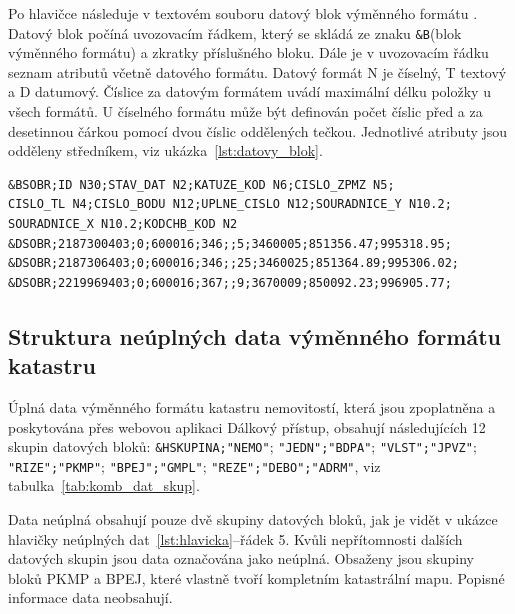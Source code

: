 Po hlavičce následuje v textovém souboru  datový blok výměnného formátu . Datový blok počíná uvozovacím řádkem, který se skládá ze znaku \verb|&B|(blok výměnného formátu) a zkratky příslušného bloku. Dále je v uvozovacím řádku seznam atributů včetně datového formátu. Datový formát N je číselný, T textový a D datumový. Číslice za datovým formátem uvádí maximální délku položky u všech formátů. U číselného formátu může být definován počet číslic před a za desetinnou čárkou pomocí dvou číslic oddělených tečkou. Jednotlivé atributy jsou odděleny středníkem, viz ukázka~\ref{lst:datovy_blok}.

{\small
\begin{lstlisting}[caption=Ukázka datového bloku SOBR(souřadnice obrazu bodů polohopisu v mapě) neúplných dat, label=lst:datovy_blok]
&BSOBR;ID N30;STAV_DAT N2;KATUZE_KOD N6;CISLO_ZPMZ N5;
CISLO_TL N4;CISLO_BODU N12;UPLNE_CISLO N12;SOURADNICE_Y N10.2;
SOURADNICE_X N10.2;KODCHB_KOD N2
&DSOBR;2187300403;0;600016;346;;5;3460005;851356.47;995318.95;
&DSOBR;2187306403;0;600016;346;;25;3460025;851364.89;995306.02;
&DSOBR;2219969403;0;600016;367;;9;3670009;850092.23;996905.77;
\end{lstlisting}}

\subsection{Struktura neúplných data výměnného formátu katastru}
\label{subsec:neuplna_data}
Úplná data výměnného formátu katastru nemovitostí, která jsou zpoplatněna a poskytována přes webovou aplikaci Dálkový přístup, obsahují následujících 12 skupin datových bloků: \verb|&HSKUPINA;"NEMO"|; \verb|"JEDN";"BDPA"|; \verb|"VLST";"JPVZ"|; \verb|"RIZE";"PKMP"|; \verb|"BPEJ";"GMPL"|; \verb|"REZE";"DEBO";"ADRM"|, viz tabulka~\ref{tab:komb_dat_skup}.

Data neúplná obsahují pouze dvě skupiny datových bloků, jak je vidět v ukázce hlavičky neúplných dat~\ref{lst:hlavicka}--řádek 5. Kvůli nepřítomnosti dalších datových skupin jsou data označována jako neúplná. Obsaženy jsou skupiny bloků PKMP a BPEJ, které vlastně tvoří kompletním katastrální mapu. Popisné informace data neobsahují.

